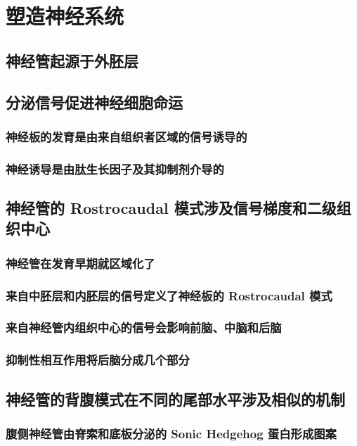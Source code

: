 \chapter{塑造神经系统}


\section{神经管起源于外胚层}

\section{分泌信号促进神经细胞命运}
\subsection{神经板的发育是由来自组织者区域的信号诱导的}
\subsection{神经诱导是由肽生长因子及其抑制剂介导的}

\section{神经管的 Rostrocaudal 模式涉及信号梯度和二级组织中心}
\subsection{神经管在发育早期就区域化了}
\subsection{来自中胚层和内胚层的信号定义了神经板的 Rostrocaudal 模式}
\subsection{来自神经管内组织中心的信号会影响前脑、中脑和后脑}
\subsection{抑制性相互作用将后脑分成几个部分}

\section{神经管的背腹模式在不同的尾部水平涉及相似的机制}
\subsection{腹侧神经管由脊索和底板分泌的 Sonic Hedgehog 蛋白形成图案}
